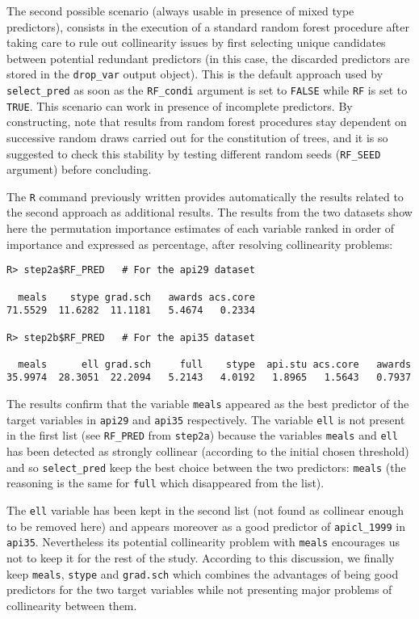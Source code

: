 The second possible scenario (always usable in presence of mixed type predictors), consists in the execution
of a standard random forest procedure after taking care to rule out collinearity issues by first selecting unique candidates between potential redundant predictors (in this case, the discarded predictors are stored in the \texttt{drop\_var} output object). This is the default approach used by \texttt{select\_pred} as soon as the \texttt{RF\_condi}
argument is set to \texttt{FALSE} while \texttt{RF} is set to \texttt{TRUE}. This scenario can work in presence of incomplete predictors. By constructing, note that results from random forest procedures stay dependent on successive random draws carried out for the constitution of trees, and it is so suggested to check this stability by testing different random seeds (\texttt{RF\_SEED} argument) before concluding.

The \texttt{R} command previously written provides automatically the results related to the second approach as
additional results. The results from the two datasets show here the permutation importance estimates of each
variable ranked in order of importance and expressed as percentage, after resolving collinearity problems:

\begin{verbatim}
R> step2a$RF_PRED   # For the api29 dataset

  meals    stype grad.sch   awards acs.core 
71.5529  11.6282  11.1181   5.4674   0.2334 

R> step2b$RF_PRED   # For the api35 dataset

  meals      ell grad.sch     full    stype  api.stu acs.core   awards 
35.9974  28.3051  22.2094   5.2143   4.0192   1.8965   1.5643   0.7937 
\end{verbatim}

The results confirm that the variable \texttt{meals} appeared as the best predictor of the target variables in \texttt{api29} and \texttt{api35} respectively. The variable \texttt{ell} is not present in the first list (see \texttt{RF\_PRED} from \texttt{step2a}) because the variables \texttt{meals} and \texttt{ell} has been detected as strongly collinear (according to the initial chosen threshold) and so \texttt{select\_pred} keep the best choice between the two predictors: \texttt{meals} (the reasoning is the same for \texttt{full} which disappeared from the list).

The \texttt{ell} variable has been kept in the second list (not found as collinear enough to be removed here)
and appears moreover as a good predictor of \texttt{apicl\_1999} in \texttt{api35}. Nevertheless its potential collinearity
problem with \texttt{meals} encourages us not to keep it for the rest of the study. According to this discussion, we
finally keep \texttt{meals}, \texttt{stype} and \texttt{grad.sch} which combines the advantages of being good predictors for the
two target variables while not presenting major problems of collinearity between them.

